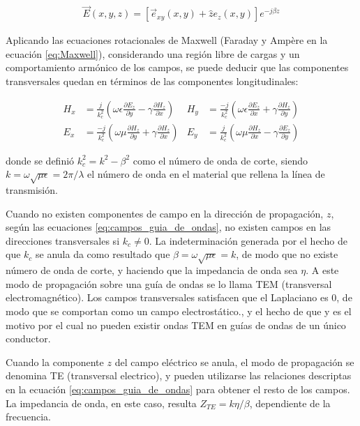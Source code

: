 \begin{align}
	\vec{E}(x,y,z) = \left[ \vec{e}_{xy}(x,y) + \hat{z} e_z(x,y) \right] e^{-j\beta z}
\end{align}

Aplicando las ecuaciones rotacionales de Maxwell (Faraday y Ampère en la ecuación \ref{eq:Maxwell}), considerando una región libre de cargas y un comportamiento armónico de los campos, se puede deducir \cite{Fernandez:Electromag} que las componentes transversales quedan en términos de las componentes longitudinales:

\begin{align}
	\label{eq:campos_guia_de_ondas}
	H_x &= \frac{j}{k_c^2} \left(\omega \epsilon \frac{\partial E_z}{\partial y} - \gamma \frac{\partial H_z}{\partial x} \right) & H_y &= \frac{-j}{k_c^2} \left(\omega \epsilon \frac{\partial E_z}{\partial x} + \gamma \frac{\partial H_z}{\partial y} \right)  \nonumber\\
	E_x &= \frac{-j}{k_c^2} \left(\omega \mu \frac{\partial H_z}{\partial y} + \gamma \frac{\partial H_z}{\partial x} \right) & E_y &= \frac{j}{k_c^2} \left(\omega \mu \frac{\partial H_z}{\partial x} - \gamma \frac{\partial E_z}{\partial y} \right)
\end{align}

donde se definió $k_c^2 = k^2 - \beta^2$ como el número de onda de corte, siendo $k = \omega \sqrt{\mu \epsilon} = 2\pi/\lambda$ el número de onda  en el material que rellena la línea de transmisión.

Cuando no existen componentes de campo en la dirección de propagación, $z$, según las ecuaciones \ref{eq:campos_guia_de_ondas}, no existen campos en las direcciones transversales si $k_c \neq 0$. La indeterminación generada por el hecho de que $k_c$ se anula da como resultado que $\beta = \omega \sqrt{\mu \epsilon} = k$, de modo que no existe número de onda de corte, y haciendo que la impedancia de onda sea $\eta$.  A este modo de propagación sobre una guía de ondas se lo llama TEM (transversal electromagnético). Los campos transversales satisfacen que el Laplaciano es 0, de modo que se comportan como un campo electrostático., y el hecho de que  y es el motivo por el cual no pueden existir ondas TEM en guías de ondas de un único conductor.

Cuando la componente $z$ del campo eléctrico se anula, el modo de propagación se denomina TE (transversal electrico), y pueden utilizarse las relaciones descriptas en la ecuación \ref{eq:campos_guia_de_ondas} para obtener el resto de los campos. La impedancia de onda, en este caso, resulta $Z_{TE} = k\eta/\beta$, dependiente de la frecuencia.

